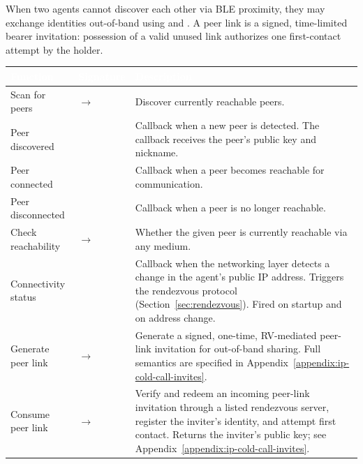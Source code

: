 When two agents cannot discover each other via BLE proximity, they may exchange identities out-of-band using  and .  A peer link is a signed, time-limited bearer invitation: possession of a valid unused link authorizes one first-contact attempt by the holder.
\begin{longtable}{L{4cm} L{5cm} L{5cm}}
\toprule
{}
\textcolor{white}{\textbf{Function}} &
\textcolor{white}{\textbf{Signature}} &
\textcolor{white}{\textbf{Description}} \\
\midrule
\endhead
Scan for peers &  $\to$  & Discover currently reachable peers. \\
Peer discovered &  & Callback when a new peer is detected. The callback receives the peer's public key and nickname.  \\

Peer connected &  & Callback when a peer becomes reachable for communication. \\
Peer disconnected &  & Callback when a peer is no longer reachable. \\
Check reachability &  $\to$  & Whether the given peer is currently reachable via any medium. \\
Connectivity status &  & Callback when the networking layer detects a change in the agent's public IP address.  Triggers the rendezvous protocol (Section~\ref{sec:rendezvous}).  Fired on startup and on address change. \\
Generate peer link &  $\to$  & Generate a signed, one-time, RV-mediated peer-link invitation for out-of-band sharing.  Full semantics are specified in Appendix~\ref{appendix:ip-cold-call-invites}. \\
Consume peer link &  $\to$  & Verify and redeem an incoming peer-link invitation through a listed rendezvous server, register the inviter's identity, and attempt first contact.  Returns the inviter's public key; see Appendix~\ref{appendix:ip-cold-call-invites}. \\
\bottomrule
\end{longtable}
